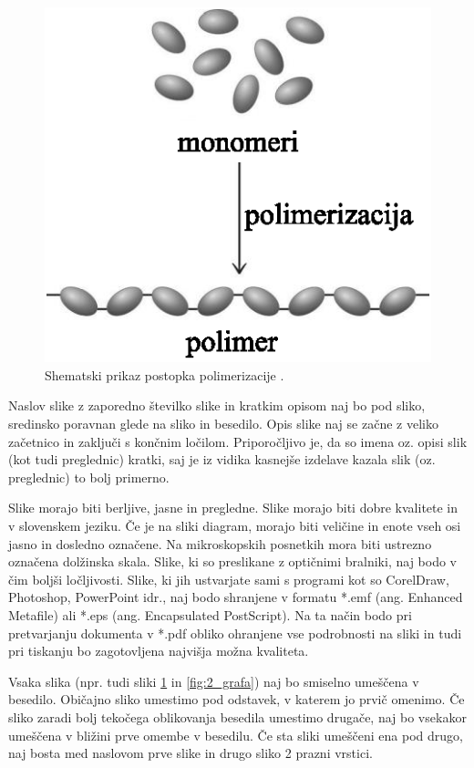 \begin{figure}[ht!]
	\begin{centering}
		\includegraphics[scale=1.0]{slike/neke_molekule}
		\caption{Shematski prikaz postopka polimerizacije \cite{Doe_1991,Bazant_2008}.} \label{fig:neke_molekule}
	\end{centering}
\end{figure}

Naslov slike z zaporedno številko slike in kratkim opisom naj bo pod sliko, sredinsko poravnan glede na sliko in besedilo. Opis slike naj se začne z veliko začetnico in zaključi s končnim ločilom. Priporočljivo je, da so imena oz. opisi slik (kot tudi preglednic) kratki, saj je iz vidika kasnejše izdelave kazala slik (oz. preglednic) to bolj primerno.

Slike morajo biti berljive, jasne in pregledne. Slike morajo biti dobre kvalitete in v slovenskem jeziku. Če je na sliki diagram, morajo biti veličine in enote vseh osi jasno in dosledno označene. Na mikroskopskih posnetkih mora biti ustrezno označena dolžinska skala. Slike, ki so preslikane z optičnimi bralniki, naj bodo v čim boljši ločljivosti. Slike, ki jih ustvarjate sami s programi kot so CorelDraw, Photoshop, PowerPoint idr., naj bodo shranjene v formatu *.emf (ang. Enhanced Metafile) ali *.eps (ang. Encapsulated PostScript). Na ta način bodo pri pretvarjanju dokumenta v *.pdf obliko ohranjene vse podrobnosti na sliki in tudi pri tiskanju bo zagotovljena najvišja možna kvaliteta.


Vsaka slika (npr. tudi sliki \ref{fig:neke_molekule} in \ref{fig:2_grafa}) naj bo smiselno umeščena v besedilo. Običajno sliko umestimo pod odstavek, v katerem jo prvič omenimo. Če sliko zaradi bolj tekočega oblikovanja besedila umestimo drugače, naj bo vsekakor umeščena v bližini prve omembe v besedilu. Če sta sliki umeščeni ena pod drugo, naj bosta med naslovom prve slike in drugo sliko 2 prazni vrstici.

